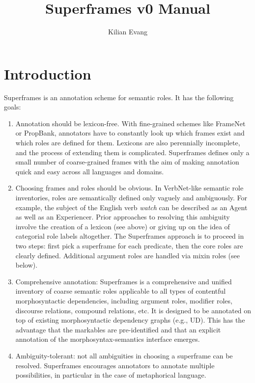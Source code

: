 \documentclass[a4paper]{article}
\title{Superframes v0 Manual}
\author{Kilian Evang}
\begin{document}
\maketitle

\begin{abstract}

\end{abstract}

\section{Introduction}

Superframes is an annotation scheme for semantic roles. It has the following goals:

\begin{enumerate}
    \item Annotation should be lexicon-free. With fine-grained schemes like FrameNet or PropBank, annotators have to constantly look up which frames exist and which roles are defined for them. Lexicons are also perennially incomplete, and the process of extending them is complicated. Superframes defines only a small number of coarse-grained frames with the aim of making annotation quick and easy across all languages and domains.
    \item Choosing frames and roles should be obvious. In VerbNet-like semantic role inventories, roles are semantically defined only vaguely and ambiguously. For example, the subject of the English verb \emph{watch} can be described as an Agent as well as an Experiencer. Prior approaches to resolving this ambiguity involve the creation of a lexicon (see above) or giving up on the idea of categorial role labels altogether. The Superframes approach is to proceed in two steps: first pick a superframe for each predicate, then the core roles are clearly defined. Additional argument roles are handled via mixin roles (see below).
    \item Comprehensive annotation: Superframes is a comprehensive and unified inventory of coarse semantic roles applicable to all types of contentful morphosyntactic dependencies, including argument roles, modifier roles, discourse relations, compound relations, etc. It is designed to be annotated on top of existing morphosyntactic dependency graphs (e.g., UD). This has the advantage that the markables are pre-identified and that an explicit annotation of the morphosyntax-semantics interface emerges.
    \item Ambiguity-tolerant: not all ambiguities in choosing a superframe can be resolved. Superframes encourages annotators to annotate multiple possibilities, in particular in the case of metaphorical language.
\end{enumerate}
\end{document}
